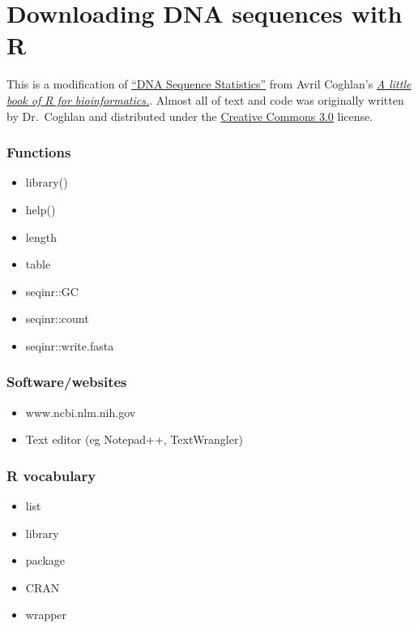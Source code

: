 \documentclass[
]{book}
\providecommand{\tightlist}{%
  \setlength{\itemsep}{0pt}\setlength{\parskip}{0pt}}
\begin{document}
\hypertarget{downloading-dna-sequences-with-r}{%
\chapter{Downloading DNA sequences with R}\label{downloading-dna-sequences-with-r}}

This is a modification of \href{https://a-little-book-of-r-for-bioinformatics.readthedocs.io/en/latest/src/chapter1.html}{``DNA Sequence Statistics''} from Avril Coghlan's \href{https://a-little-book-of-r-for-bioinformatics.readthedocs.io/en/latest/index.html}{\emph{A little book of R for bioinformatics.}}. Almost all of text and code was originally written by Dr.~Coghlan and distributed under the \href{https://creativecommons.org/licenses/by/3.0/us/}{Creative Commons 3.0} license.

\hypertarget{functions}{%
\subsection{Functions}\label{functions}}

\begin{itemize}
\tightlist
\item
  library()
\item
  help()
\item
  length
\item
  table
\item
  seqinr::GC
\item
  seqinr::count
\item
  seqinr::write.fasta
\end{itemize}

\hypertarget{softwarewebsites}{%
\subsection{Software/websites}\label{softwarewebsites}}

\begin{itemize}
\tightlist
\item
  www.ncbi.nlm.nih.gov
\item
  Text editor (eg Notepad++, TextWrangler)
\end{itemize}

\hypertarget{r-vocabulary}{%
\subsection{R vocabulary}\label{r-vocabulary}}

\begin{itemize}
\tightlist
\item
  list
\item
  library
\item
  package
\item
  CRAN
\item
  wrapper
\end{itemize}
\end{document}
